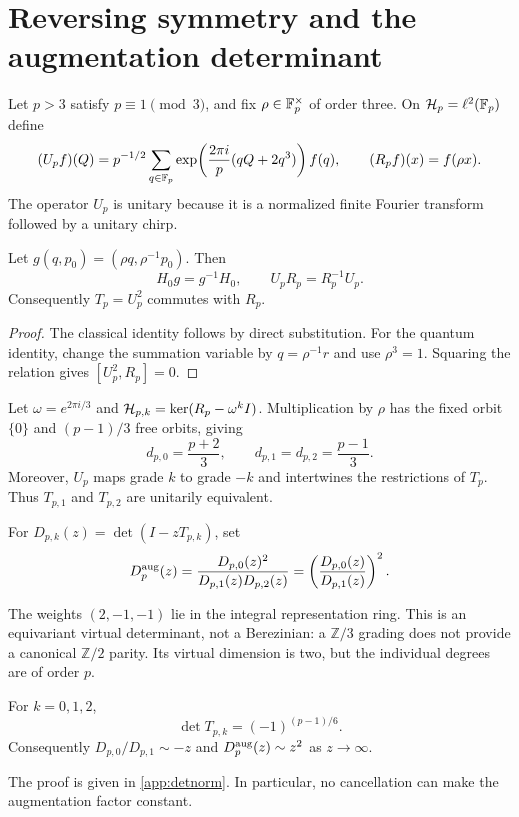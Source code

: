 \section{Reversing symmetry and the augmentation determinant}

Let $p>3$ satisfy $p\equiv1\pmod3$, and fix
$\rho\in\mathbb F_p^\times$ of order three.  On
$\mathcal H_p=\ell^2(\mathbb F_p)$ define
\[
(U_pf)(Q)=p^{-1/2}\sum_{q\in\mathbb F_p}
\exp\!\left(\frac{2\pi i}{p}(qQ+2q^3)\right)f(q),
\qquad
(R_pf)(x)=f(\rho x).
\]
The operator $U_p$ is unitary because it is a normalized finite Fourier
transform followed by a unitary chirp.

\begin{theorem}\label{thm:symmetry}
Let $g(q,p_0)=(\rho q,\rho^{-1}p_0)$.  Then
\[
H_0g=g^{-1}H_0,
\qquad
U_pR_p=R_p^{-1}U_p.
\]
Consequently $T_p=U_p^2$ commutes with $R_p$.
\end{theorem}

\begin{proof}
The classical identity follows by direct substitution.  For the quantum
identity, change the summation variable by $q=\rho^{-1}r$ and use
$\rho^3=1$.  Squaring the relation gives $[U_p^2,R_p]=0$.
\end{proof}

Let $\omega=e^{2\pi i/3}$ and
$\mathcal H_{p,k}=\ker(R_p-\omega^kI)$.  Multiplication by $\rho$ has the fixed
orbit $\{0\}$ and $(p-1)/3$ free orbits, giving
\[
d_{p,0}=\frac{p+2}{3},\qquad
d_{p,1}=d_{p,2}=\frac{p-1}{3}.
\]
Moreover, $U_p$ maps grade $k$ to grade $-k$ and intertwines the
restrictions of $T_p$.  Thus $T_{p,1}$ and $T_{p,2}$ are unitarily
equivalent.

\begin{definition}
For $D_{p,k}(z)=\det(I-zT_{p,k})$, set
\[
D^{\mathrm{aug}}_p(z)=
\frac{D_{p,0}(z)^2}{D_{p,1}(z)D_{p,2}(z)}
=\left(\frac{D_{p,0}(z)}{D_{p,1}(z)}\right)^2.
\]
\end{definition}

The weights $(2,-1,-1)$ lie in the integral representation ring.  This is an
equivariant virtual determinant, not a Berezinian: a $\mathbb Z/3$ grading
does not provide a canonical $\mathbb Z/2$ parity.  Its virtual dimension is
two, but the individual degrees are of order $p$.

\begin{proposition}\label{prop:detnorm}
For $k=0,1,2$,
\[
\det T_{p,k}=(-1)^{(p-1)/6}.
\]
Consequently $D_{p,0}/D_{p,1}\sim-z$ and
$D^{\mathrm{aug}}_p(z)\sim z^2$ as $z\to\infty$.
\end{proposition}

The proof is given in \cref{app:detnorm}.  In particular, no cancellation can
make the augmentation factor constant.
